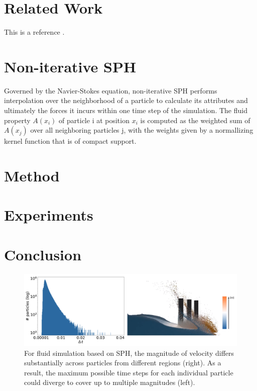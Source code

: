 \documentclass[
	11pt, 
	DIV10,
	ngerman,
	a4paper, 
	oneside, 
	headings=normal, 
	captions=tableheading,
	final, 
	numbers=noenddot
]{scrartcl}
\begin{document}
\section{Related Work}

This is a reference \cite{Foley:1990}.

\section{Non-iterative SPH}

Governed by the Navier-Stokes equation, non-iterative SPH performs interpolation over the neighborhood of a particle to calculate its attributes and ultimately the forces it incurs within one time step of the simulation. The fluid property $ A(x_{i}) $ of particle i at position $ x_{i} $ is computed as the weighted sum of  $ A(x_{j}) $ over all neighboring particles j, with the weights given by a normallizing kernel function that is of compact support. 

\section{Method}

\section{Experiments}

\section{Conclusion}

\begin{figure}[tb]
	\centering
	\includegraphics[scale=0.3]{images/1}
	\caption{
		\label{fig:im1} For fluid simulation based on SPH, the magnitude of velocity differs substantially 			across particles from different regions (right). As a result, the maximum possible time steps for each 		individual particle could diverge to cover up to multiple magnitudes (left).
	}
\end{figure}



\end{document}
